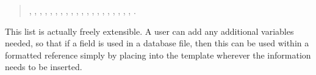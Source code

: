 \documentclass[letterpaper,10pt,english]{sphinxmanual}
\begin{document}
\begin{enumerate}
\begin{quote}
, , , , , , , , , , , , , , , , , , , , .
\end{quote}

This list is actually freely extensible. A user can add any additional variables needed, so that if a  field is used in a  database file, then this can be used within a formatted reference simply by placing  into the template wherever the information needs to be inserted.


\end{enumerate}
\end{document}
